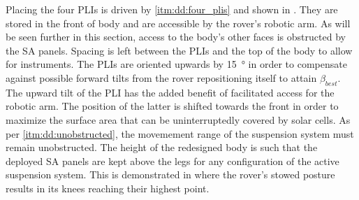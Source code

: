 Placing the four \acp{PLI} is driven by \ref{itm:dd:four_plis} and shown in . They are stored in the front of body and are accessible by the rover's robotic arm. As will be seen further in this section, access to the body's other faces is obstructed by the \ac{SA} panels. Spacing is left between the \acp{PLI} and the top of the body to allow for instruments. The \acp{PLI} are oriented upwards by \SI{15}{\degree} in order to compensate against possible forward tilts from the rover repositioning itself to attain $\beta_{best}$. The upward tilt of the \ac{PLI} has the added benefit of facilitated access for the robotic arm. The position of the latter is shifted towards the front in order to maximize the surface area that can be uninterruptedly covered by solar cells. As per \ref{itm:dd:unobstructed}, the movemement range of the suspension system must remain unobstructed. The height of the redesigned body is such that the deployed \ac{SA} panels are kept above the legs for any configuration of the active suspension system. This is demonstrated in  where the rover's stowed posture results in its knees reaching their highest point.

